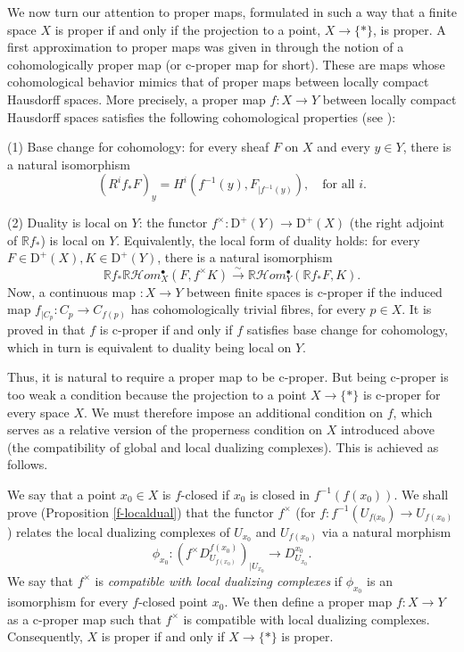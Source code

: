 \documentclass[amssymb,amscd,11pt,20pt]{amsart}
\newcommand{\RR}{\mathbb R}
\newcommand{\0}{\mathbf 0}
\newcommand{\pun}{{\scriptscriptstyle \bullet}}
\newcommand{\HHom}{\mathcal{H}om}
\theoremstyle{plain}
\numberwithin{equation}{thm}
\begin{document}
We now turn our attention to proper maps, formulated in such a way that a finite space $X$ is proper if and only if the projection to a point, $X\to \{*\}$, is proper. A first approximation to proper maps was given in \cite{Sanchoetal} through the notion of a cohomologically proper map (or c-proper map for short). These are maps whose cohomological behavior mimics that of proper maps between locally compact Hausdorff spaces. More precisely, a proper map $f\colon X\to Y$ between locally compact Hausdorff spaces satisfies the following cohomological properties (see \cite{Iversen}):

(1) Base change for cohomology: for every sheaf $F$ on $X$ and every $y\in Y$, there is a natural isomorphism
\[(R^if_*F)_y= H^i(f^{-1}(y),F_{\vert f^{-1}(y)}),\quad \text{for all }  i.\]

(2) Duality is local on $Y$: the functor $f^\times\colon \mathrm{D}^+(Y)\to \mathrm{D}^+(X) $ (the right adjoint of $\RR f_*$) is local on $Y$. Equivalently, the local form of duality holds:  for every $F\in \mathrm{D}^+(X),K\in \mathrm{D}^+(Y)$, there is a natural   isomorphism
\[\RR f_*\RR\HHom_X^\pun(F,f^\times K)\overset\sim\to\RR\HHom_Y^\pun(\RR f_*F,K).\] 
Now, a continuous map $\colon X\to Y$ between finite spaces is c-proper if the induced map $f_{\vert C_p}\colon C_p\to C_{f(p)}$ has cohomologically trivial fibres, for every $p\in X$. It is proved in \cite{Sanchoetal} that $f$ is c-proper if and only if $f$ satisfies base change for cohomology, which in turn is equivalent to duality being local on $Y$.

Thus, it is natural to require a proper map to be c-proper. But being c-proper is too  weak a condition because the projection to a point $X\to\{*\}$ is   c-proper for every space $X$. We must therefore impose an additional condition on $f$, which serves as a relative version of the properness condition on $X$ introduced above (the compatibility of global and local dualizing complexes). This is achieved as follows.

We say that a point $x_0\in X$ is $f$-closed if $x_0$ is closed in $f^{-1}(f(x_0))$. We shall prove (Proposition \ref{f-localdual}) that the functor $f^\times$ (for $f\colon f^{-1}(U_{f(x_0})\to U_{f(x_0)}$) relates the local dualizing complexes of $U_{x_0}$ and $U_{f(x_0)}$ via a natural morphism
\[ \phi_{x_0}\colon (f^\times D_{U_{f(x_0)}}^{f(x_0)})_{\vert U_{x_0}}\to D_{U_{x_0}}^{x_0}.\] We say that $f^\times$ is \emph{compatible with local dualizing complexes} if $\phi_{x_0}$ is an isomorphism for every $f$-closed point $x_0$. We  then define a proper map $f\colon X\to Y$ as a c-proper map such that $f^\times$ is compatible with local dualizing complexes. Consequently, $X$ is proper if and only if $X\to\{*\}$ is proper. 
\end{document}
